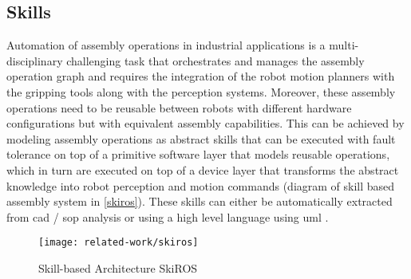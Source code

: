 

\subsection{Skills}

Automation of assembly operations in industrial applications \cite{Patel2012} is a multi-disciplinary challenging task that orchestrates and manages the assembly operation graph and requires the integration of the robot motion planners with the gripping tools \cite{Thomas2015} along with the perception systems. Moreover, these assembly operations need to be reusable \cite{Butting2016,Andersen2014} between robots with different hardware configurations \cite{Thomas2002} but with equivalent assembly capabilities. This can be achieved by modeling assembly operations as abstract skills \cite{Holz2015} that can be executed with fault tolerance \cite{ThomasICRA2003} on top of a primitive software layer that models reusable operations, which in turn are executed on top of a device layer that transforms the abstract knowledge into robot perception and motion commands (diagram of skill based assembly system in \cref{skiros}). These skills can either be automatically extracted from \gls{cad} / \gls{sop} analysis \cite{Thomas2001} or using a high level language using \gls{uml} \cite{ThomasICRA2013}.

\begin{figure}[H]
	\centering
	\texttt{[image: related-work/skiros]}
	\caption[Skill-based Architecture SkiROS]{Skill-based Architecture SkiROS \cite{Holz2015}}
	\label{fig:skiros}
\end{figure}


